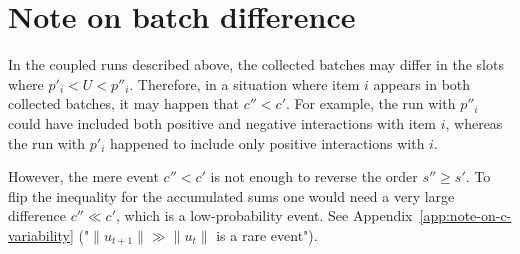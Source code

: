\section{Note on batch difference}
\label{app:note-on-batch-difference}

In the coupled runs described above, the collected batches may differ in the slots where $p'_i < U < p''_i$. Therefore, in a situation where item $i$ appears in both collected batches, it may happen that $c'' < c'$. For example, the run with $p''_i$ could have included both positive and negative interactions with item $i$, whereas the run with $p'_i$ happened to include only positive interactions with $i$.

However, the mere event $c'' < c'$ is not enough to reverse the order $s'' \ge s'$. To flip the inequality for the accumulated sums one would need a very large difference $c'' \ll c'$, which is a low-probability event. See Appendix~\ref{app:note-on-c-variability} ("$\|u_{t+1}\| \gg \|u_t\|$ is a rare event").


